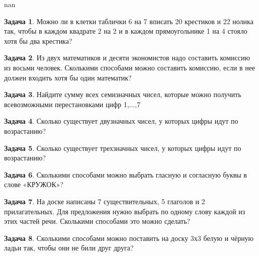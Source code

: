 \documentclass[a4paper,11pt]{article}%
\theoremstyle{definition}%
\newtheorem{Ex}{\hspace{-25pt}\fbox{\phantom{123}} Задача}%
\begin{document}
nan%
\fi%
%
\begin{Ex}%
Можно ли в клетки таблички 6 на 7 вписать 20 крестиков и 22 нолика так, чтобы в каждом квадрате 2 на 2 и в каждом прямоугольнике 1 на 4 стояло хотя бы два крестика?%
%
\end{Ex}%
%
\iffalse%
Автор: ЗМШ%
Дата: 2013%
Название: %
Подсказка: \textbackslash{}\textbackslash{}%
nan%
\fi%
%
\begin{Ex}%
Из двух математиков и десяти экономистов надо составить комиссию из восьми человек. Сколькими способами можно составить комиссию, если в нее должен входить хотя бы один математик? %
%
\end{Ex}%
%
\iffalse%
Автор: Лев Юманов%
Дата: 2016%
Название: %
Подсказка: \textbackslash{}\textbackslash{}%
nan%
\fi%
%
\begin{Ex}%
Найдите сумму всех семизначных чисел, которые можно получить всевозможными перестановками цифр 1,...,7%
%
\end{Ex}%
%
\iffalse%
Автор: Лев Юманов%
Дата: 2016%
Название: %
Подсказка: \textbackslash{}\textbackslash{}%
nan%
\fi%
%
\begin{Ex}%
Сколько существует двузначных чисел, у которых цифры идут по возрастанию?%
%
\end{Ex}%
%
\iffalse%
Автор: Ираклий Гагуа%
Дата: 2011%
Название: %
Подсказка: \textbackslash{}\textbackslash{}%
nan%
\fi%
%
\begin{Ex}%
Сколько существует трехзначных чисел, у которых цифры идут по возрастанию?%
%
\end{Ex}%
%
\iffalse%
Автор: Ираклий Гагуа%
Дата: 2011%
Название: %
Подсказка: \textbackslash{}\textbackslash{}%
nan%
\fi%
%
\begin{Ex}%
Сколькими способами можно выбрать гласную и согласную буквы в слове «КРУЖОК»?%
%
\end{Ex}%
%
\iffalse%
Автор: Ираклий Гагуа%
Дата: 2011%
Название: %
Подсказка: \textbackslash{}\textbackslash{}%
nan%
\fi%
%
\begin{Ex}%
На доске написаны 7 существительных, 5 глаголов и 2 прилагательных. Для предложения нужно выбрать по одному слову каждой из этих частей речи. Сколькими способами это можно сделать?%
%
\end{Ex}%
%
\iffalse%
Автор: Ираклий Гагуа%
Дата: 2011%
Название: %
Подсказка: \textbackslash{}\textbackslash{}%
nan%
\fi%
%
\begin{Ex}%
Сколькими способами можно поставить на доску 3х3 белую и чёрную ладьи так, чтобы они не били друг друга?%
%
\end{Ex}%
\end{document}
